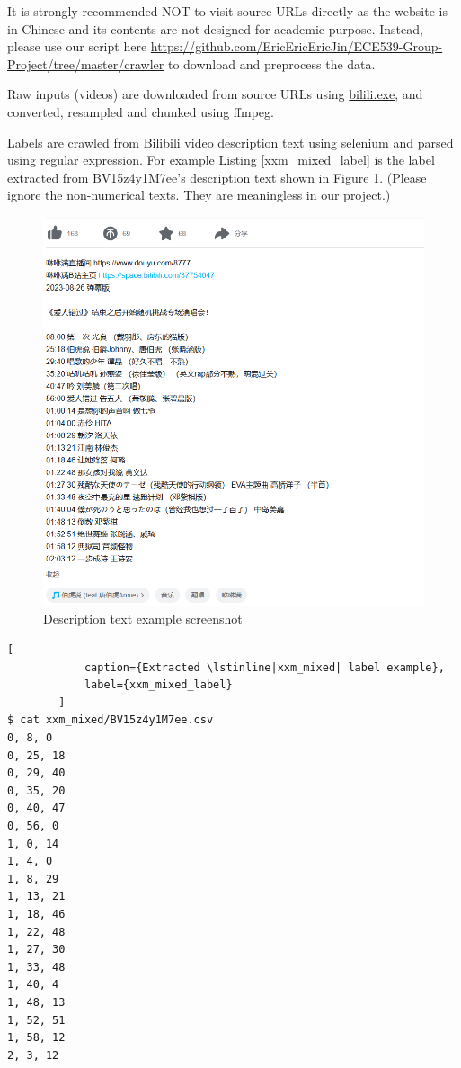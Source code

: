 \documentclass{article}
\begin{document}
    It is strongly recommended NOT to visit source URLs directly as the website is in Chinese and its contents are not designed for academic purpose. Instead, please use our script here \url{https://github.com/EricEricEricJin/ECE539-Group-Project/tree/master/crawler} to download and preprocess the data.


    Raw inputs (videos) are downloaded from source URLs using \href{https://github.com/yutto-dev/bilili}{bilili.exe}, and converted, resampled and chunked using ffmpeg. 
    
    Labels are crawled from Bilibili video description text using selenium and parsed using regular expression. For example Listing \ref{xxm_mixed_label} is the label extracted from BV15z4y1M7ee's description text shown in Figure \ref{desc_ss}. (Please ignore the non-numerical texts. They are meaningless in our project.)

    \begin{minipage}{0.45\linewidth}
        \begin{figure}[H]
            \includegraphics[width=\linewidth]{figures/desc_ss.png}
            \caption{Description text example screenshot}
            \label{desc_ss}
        \end{figure}
    \end{minipage}
    \begin{minipage}{0.52\linewidth}
        \begin{lstlisting}[
            caption={Extracted \lstinline|xxm_mixed| label example},
            label={xxm_mixed_label}
        ]
$ cat xxm_mixed/BV15z4y1M7ee.csv
0, 8, 0
0, 25, 18
0, 29, 40
0, 35, 20
0, 40, 47
0, 56, 0
1, 0, 14
1, 4, 0
1, 8, 29
1, 13, 21
1, 18, 46
1, 22, 48
1, 27, 30
1, 33, 48
1, 40, 4
1, 48, 13
1, 52, 51
1, 58, 12
2, 3, 12
        \end{lstlisting}
    \end{minipage}
\end{document}
